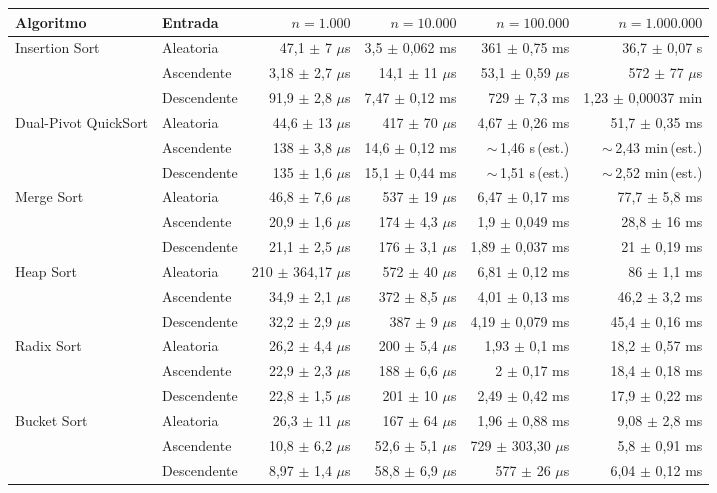 {\scriptsize
\begin{tabular}{llrrrr}
\toprule
Algoritmo & Entrada & $n=1.000$ & $n=10.000$ & $n=100.000$ & $n=1.000.000$ \\
\midrule
Insertion Sort & Aleatoria & 47,1 $\pm$ 7 $\mu$s & 3,5 $\pm$ 0,062 ms & 361 $\pm$ 0,75 ms & 36,7 $\pm$ 0,07 s \\
 & Ascendente & 3,18 $\pm$ 2,7 $\mu$s & 14,1 $\pm$ 11 $\mu$s & 53,1 $\pm$ 0,59 $\mu$s & 572 $\pm$ 77 $\mu$s \\
 & Descendente & 91,9 $\pm$ 2,8 $\mu$s & 7,47 $\pm$ 0,12 ms & 729 $\pm$ 7,3 ms & 1,23 $\pm$ 0,00037 min \\
Dual-Pivot QuickSort & Aleatoria & 44,6 $\pm$ 13 $\mu$s & 417 $\pm$ 70 $\mu$s & 4,67 $\pm$ 0,26 ms & 51,7 $\pm$ 0,35 ms \\
 & Ascendente & 138 $\pm$ 3,8 $\mu$s & 14,6 $\pm$ 0,12 ms & $\sim$\,1,46 s\,(est.) & $\sim$\,2,43 min\,(est.) \\
 & Descendente & 135 $\pm$ 1,6 $\mu$s & 15,1 $\pm$ 0,44 ms & $\sim$\,1,51 s\,(est.) & $\sim$\,2,52 min\,(est.) \\
Merge Sort & Aleatoria & 46,8 $\pm$ 7,6 $\mu$s & 537 $\pm$ 19 $\mu$s & 6,47 $\pm$ 0,17 ms & 77,7 $\pm$ 5,8 ms \\
 & Ascendente & 20,9 $\pm$ 1,6 $\mu$s & 174 $\pm$ 4,3 $\mu$s & 1,9 $\pm$ 0,049 ms & 28,8 $\pm$ 16 ms \\
 & Descendente & 21,1 $\pm$ 2,5 $\mu$s & 176 $\pm$ 3,1 $\mu$s & 1,89 $\pm$ 0,037 ms & 21 $\pm$ 0,19 ms \\
Heap Sort & Aleatoria & 210 $\pm$ 364,17 $\mu$s & 572 $\pm$ 40 $\mu$s & 6,81 $\pm$ 0,12 ms & 86 $\pm$ 1,1 ms \\
 & Ascendente & 34,9 $\pm$ 2,1 $\mu$s & 372 $\pm$ 8,5 $\mu$s & 4,01 $\pm$ 0,13 ms & 46,2 $\pm$ 3,2 ms \\
 & Descendente & 32,2 $\pm$ 2,9 $\mu$s & 387 $\pm$ 9 $\mu$s & 4,19 $\pm$ 0,079 ms & 45,4 $\pm$ 0,16 ms \\
Radix Sort & Aleatoria & 26,2 $\pm$ 4,4 $\mu$s & 200 $\pm$ 5,4 $\mu$s & 1,93 $\pm$ 0,1 ms & 18,2 $\pm$ 0,57 ms \\
 & Ascendente & 22,9 $\pm$ 2,3 $\mu$s & 188 $\pm$ 6,6 $\mu$s & 2 $\pm$ 0,17 ms & 18,4 $\pm$ 0,18 ms \\
 & Descendente & 22,8 $\pm$ 1,5 $\mu$s & 201 $\pm$ 10 $\mu$s & 2,49 $\pm$ 0,42 ms & 17,9 $\pm$ 0,22 ms \\
Bucket Sort & Aleatoria & 26,3 $\pm$ 11 $\mu$s & 167 $\pm$ 64 $\mu$s & 1,96 $\pm$ 0,88 ms & 9,08 $\pm$ 2,8 ms \\
 & Ascendente & 10,8 $\pm$ 6,2 $\mu$s & 52,6 $\pm$ 5,1 $\mu$s & 729 $\pm$ 303,30 $\mu$s & 5,8 $\pm$ 0,91 ms \\
 & Descendente & 8,97 $\pm$ 1,4 $\mu$s & 58,8 $\pm$ 6,9 $\mu$s & 577 $\pm$ 26 $\mu$s & 6,04 $\pm$ 0,12 ms \\
\bottomrule
\end{tabular}}\par
